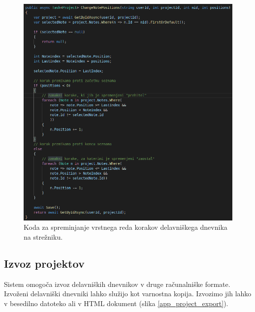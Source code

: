 \documentclass[a4paper, 12pt]{book}
\begin{document}
\begin{figure}[H]
\begin{center}
	\includegraphics[width=13.5cm]{api_code_changepos}
\end{center}
	\caption{Koda za spreminjanje vrstnega reda korakov delavniškega dnevnika na strežniku.}
\label{api_code_changepos}
\end{figure}



\subsection{Izvoz projektov}

Sistem omogoča izvoz delavniških dnevnikov v druge računalniške formate.
Izvoženi delavniški dnevniki lahko služijo kot varnostna kopija.
Izvozimo jih lahko v besedilno datoteko ali v HTML dokument (slika \ref{app_project_export}).
\end{document}
